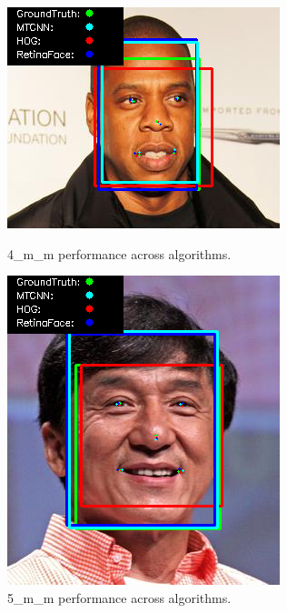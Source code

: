 \documentclass{l4proj}
\begin{document}
\begin{appendices}
\begin{figure}[h!]
  \centering
  \begin{minipage}{0.49\textwidth}
    \centering
     \includegraphics[width=\textwidth]{images/appendix/4.png}
    \caption{4\_m\_m performance across algorithms.}
    \label{whoopi_result}
  \end{minipage}
    \hfill
    \begin{minipage}{0.49\textwidth}
    \centering
     \includegraphics[width=\textwidth]{images/appendix/5.png}
    \caption{5\_m\_m performance across algorithms.}
    \label{whoopi_result}
  \end{minipage}
\end{figure}


\end{appendices}
\end{document}

